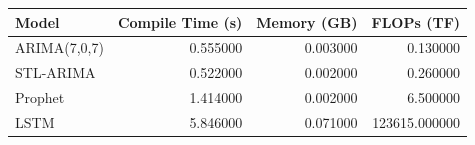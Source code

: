 \begin{tabular}{lrrr}
\toprule
Model & Compile Time (s) & Memory (GB) & FLOPs (TF) \\
\midrule
ARIMA(7,0,7) & 0.555000 & 0.003000 & 0.130000 \\
STL-ARIMA & 0.522000 & 0.002000 & 0.260000 \\
Prophet & 1.414000 & 0.002000 & 6.500000 \\
LSTM & 5.846000 & 0.071000 & 123615.000000 \\
\bottomrule
\end{tabular}
